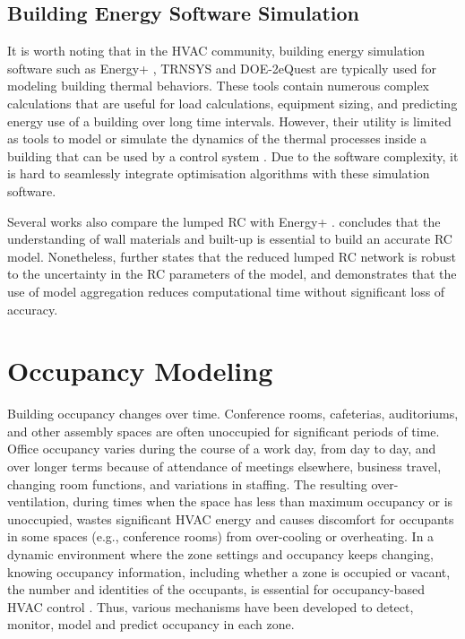 \subsection{Building Energy Software Simulation}

It is worth noting that in the HVAC community, building energy simulation software such as Energy+ \citep{crawley2000energyplus}, TRNSYS \citep{university2010trnsys} and DOE-2\/eQuest \citep{hirsch2010equest} are typically used for modeling building thermal behaviors. These tools contain numerous complex calculations that are useful for load calculations, equipment sizing, and predicting energy use of a building over long time intervals. However, their utility is limited as tools to model or simulate the dynamics of the thermal processes inside a building that can be used by a control system \citep{goyal2011identification}. Due to the software complexity, it is hard to seamlessly integrate optimisation algorithms with these simulation software.

Several works also compare the lumped RC with Energy+ \citep{sturzenegger2012semi,dobbs2012automatic,eisenhower2012uncertainty}. \cite{sturzenegger2012semi} concludes that the understanding of wall materials and built-up is essential to build an accurate RC model. Nonetheless, \cite{eisenhower2012uncertainty} further states that the reduced lumped RC network is robust to the uncertainty in the RC parameters of the model, and \cite{dobbs2012automatic} demonstrates that the use of model aggregation reduces computational time without significant loss of accuracy.


\section{Occupancy Modeling} \label{cha:bg:occ} 

Building occupancy changes over time. 
Conference rooms, cafeterias, auditoriums, and other assembly spaces are often unoccupied for significant periods of time. Office occupancy varies during the course of a work day, from day to day, and over longer terms because of attendance of meetings elsewhere, business travel, changing room functions, and variations in staffing. The resulting over-ventilation,
during times when the space has less than maximum occupancy or is unoccupied, wastes significant HVAC energy and causes discomfort for occupants in some spaces (e.g., conference rooms) from over-cooling or overheating. In a dynamic environment where the zone settings and occupancy keeps changing, knowing occupancy information, including whether a zone is occupied or vacant, the number and identities of the occupants, is essential for occupancy-based HVAC control \citep{erickson2010occupancy,nguyen2013energy}. Thus, various mechanisms have been developed to detect, monitor, model and predict occupancy in each zone. 

